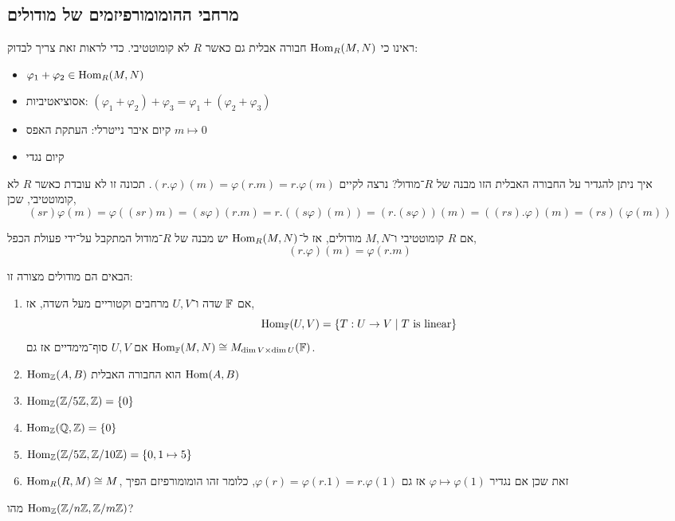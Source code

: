 \subsection{מרחבי ההומומורפיזמים של מודולים}
ראינו כי $\operatorname{Hom}_R(M, N)$ חבורה אבלית גם כאשר $R$ לא קומוטטיבי.
כדי לראות זאת צריך לבדוק:
\begin{itemize}
	\item $\varphi_1 + \varphi_2 \in \operatorname{Hom}_R(M, N)$
	\item אסוציאטיביות: $(\varphi_1 + \varphi_2) + \varphi_3 = \varphi_1 + (\varphi_2 + \varphi_3)$
	\item קיום איבר נייטרלי: העתקת האפס $m \mapsto 0$
	\item קיום נגדי
\end{itemize}
איך ניתן להגדיר על החבורה האבלית הזו מבנה של $R$־מודול?
נרצה לקיים $(r . \varphi)(m) = \varphi(r . m) = r . \varphi(m)$.
תכונה זו לא עובדת כאשר $R$ לא קומוטטיבי, שכן,
\[
	(s r) \varphi(m)
	= \varphi((s r) m)
	= (s \varphi)(r . m)
	= r . ((s \varphi)(m))
	= (r . (s \varphi))(m)
	= ((r s) . \varphi)(m)
	= (r s)(\varphi(m))
\]
\begin{definition}
	אם $R$ קומוטטיבי ו־$M, N$ מודולים, אז ל־$\operatorname{Hom}_R(M, N)$ יש מבנה של $R$־מודול המתקבל על־ידי פעולת הכפל,
	\[
		(r . \varphi)(m)
		= \varphi(r . m)
	\]
\end{definition}
\begin{example}
	הבאים הם מודולים מצורה זו:
	\begin{enumerate}
		\item אם $\mathbb{F}$ שדה ו־$U, V$ מרחבים וקטוריים מעל השדה, אז,
			\[
				\operatorname{Hom}_{\mathbb{F}}(U, V)
				= \{ T : U \to V \mid T \text{ is linear} \}
			\]
			אם $U, V$ סוף־מימדיים אז גם $\operatorname{Hom}_{\mathbb{F}}(M, N) \cong M_{\dim V \times \dim U}(\mathbb{F})$.
		\item $\operatorname{Hom}_{\mathbb{Z}}(A, B)$ הוא החבורה האבלית $\operatorname{Hom}(A, B)$
		\item $\operatorname{Hom}_{\mathbb{Z}}(\mathbb{Z} / 5 \mathbb{Z}, \mathbb{Z}) = \{ 0 \}$
		\item $\operatorname{Hom}_{\mathbb{Z}}(\mathbb{Q}, \mathbb{Z}) = \{ 0 \}$
		\item $\operatorname{Hom}_{\mathbb{Z}}(\mathbb{Z} / 5 \mathbb{Z}, \mathbb{Z} / 10 \mathbb{Z}) = \{0, 1 \mapsto 5 \}$
		\item $\operatorname{Hom}_R(R, M) \cong M$, זאת שכן אם נגדיר $\varphi \mapsto \varphi(1)$ אז גם $\varphi(r) = \varphi(r . 1) = r . \varphi(1)$, כלומר זהו הומומורפיזם הפיך
	\end{enumerate}
\end{example}
\begin{exercise}
	מהו $\operatorname{Hom}_{\mathbb{Z}}(\mathbb{Z} / n \mathbb{Z}, \mathbb{Z} / m \mathbb{Z})$?
\end{exercise}

